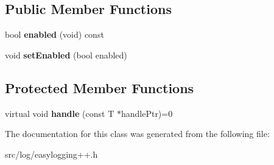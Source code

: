 \subsection*{Public Member Functions}
\begin{DoxyCompactItemize}
\item 
bool {\bfseries enabled} (void) const \hypertarget{classel_1_1Callback_a1e3089fd19a11965e7b98bd423116bbd}{}\label{classel_1_1Callback_a1e3089fd19a11965e7b98bd423116bbd}

\item 
void {\bfseries set\+Enabled} (bool enabled)\hypertarget{classel_1_1Callback_a05e68cb0b5ea4423913fa2ec4ea306b4}{}\label{classel_1_1Callback_a05e68cb0b5ea4423913fa2ec4ea306b4}

\end{DoxyCompactItemize}
\subsection*{Protected Member Functions}
\begin{DoxyCompactItemize}
\item 
virtual void {\bfseries handle} (const T $\ast$handle\+Ptr)=0\hypertarget{classel_1_1Callback_a8997c7971d65062c374ef24e653061be}{}\label{classel_1_1Callback_a8997c7971d65062c374ef24e653061be}

\end{DoxyCompactItemize}


The documentation for this class was generated from the following file\+:\begin{DoxyCompactItemize}
\item 
src/log/easylogging++.\+h\end{DoxyCompactItemize}
